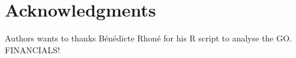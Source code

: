 \documentclass[10pt,letterpaper]{article}
\begin{document}
% 
% 

\section*{Acknowledgments}
Authors wants to thanks Bénédicte Rhoné for his R script to analyse the GO.
FINANCIALS!
\end{document}
